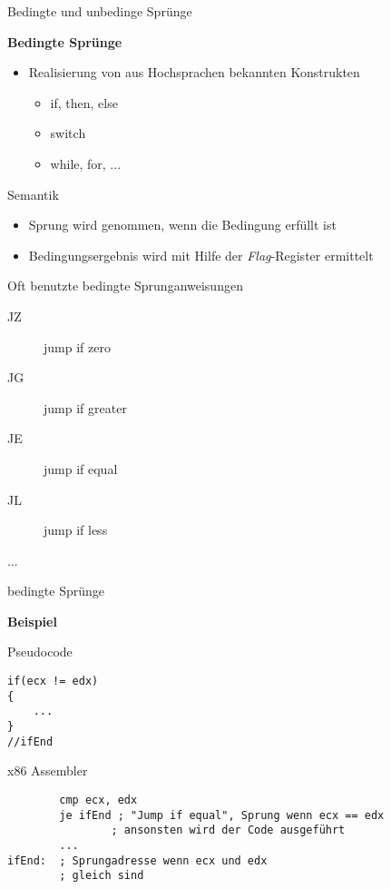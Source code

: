 \begin{frame}[fragile]{Bedingte und unbedinge Sprünge}

\begin{center}
\textbf{Bedingte Sprünge}
\end{center}

\begin{itemize}
	\item Realisierung von aus Hochsprachen bekannten Konstrukten
	\begin{itemize}
		\item if, then, else
		\item switch
		\item while, for, ...
	\end{itemize}
\end{itemize}

\makebox{}

Semantik
\begin{itemize}
	\item Sprung wird genommen, wenn die Bedingung erfüllt ist
	\item Bedingungsergebnis wird mit Hilfe der \textit{Flag}-Register ermittelt
\end{itemize}
\end{frame}


\begin{frame}
Oft benutzte bedingte Sprunganweisungen
\begin{description}
	\item [JZ] jump if zero
	\item [JG] jump if greater 
	\item [JE] jump if equal 
	\item [JL] jump if less 
	\item [...]
\end{description}
\end{frame}


\begin{frame}[fragile]{bedingte Sprünge}

\begin{center}
\textbf{Beispiel}
\end{center}

Pseudocode
\begin{lstlisting}
if(ecx != edx)
{
	...
}
//ifEnd
\end{lstlisting}

x86 Assembler
\begin{lstlisting}
        cmp ecx, edx
        je ifEnd ; "Jump if equal", Sprung wenn ecx == edx
				; ansonsten wird der Code ausgeführt
        ...
ifEnd:  ; Sprungadresse wenn ecx und edx
        ; gleich sind 
\end{lstlisting}
\end{frame}


